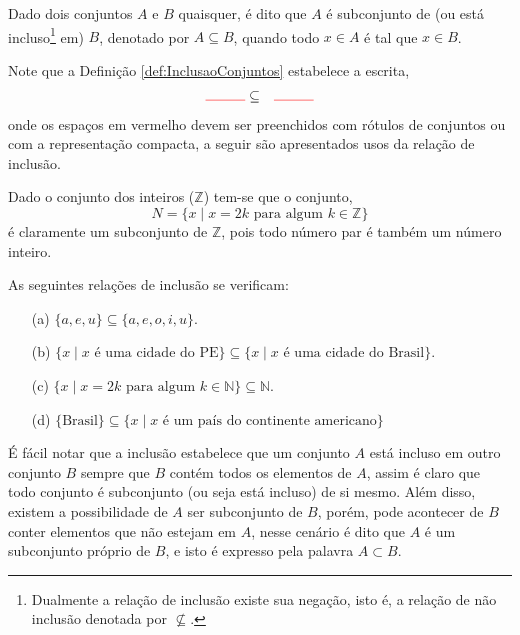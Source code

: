 \begin{definicao}\label{def:InclusaoConjuntos}
  \cite{lipschutz1978-TC} Dado dois conjuntos $A$ e $B$ quaisquer, é dito que $A$ é subconjunto de (ou está incluso\footnote{Dualmente a relação de inclusão existe sua negação, isto é, a relação de não inclusão denotada por $\not\subseteq$.} em) $B$, denotado por $A \subseteq B$, quando todo $x \in A$ é tal que $x \in B$.
\end{definicao}

Note que a Definição \ref{def:InclusaoConjuntos} estabelece a escrita,
\begin{eqnarray*}
  {\color{red}\rule{1cm}{0.4pt}} & \subseteq & {\color{red}\rule{1cm}{0.4pt}} 
\end{eqnarray*}
onde os espaços em {\color{red}vermelho} devem ser preenchidos com rótulos de conjuntos ou com a representação compacta, a seguir são apresentados usos da relação de inclusão.

\begin{exemplo}\label{exe:InclusaoConjuntos1}
  Dado o conjunto dos inteiros ($\mathbb{Z}$) tem-se que o conjunto,  
  $$N = \{x \mid x = 2k \mbox{ para algum } k \in \mathbb{Z}\}$$ 
  é claramente um subconjunto de $\mathbb{Z}$, pois todo número par é também um número inteiro.
\end{exemplo}

\begin{exemplo}\label{exe:InclusaoConjuntos2}
  As seguintes relações de inclusão se verificam:
	\begin{itemize}
		\item[(a)] $\{a, e, u\} \subseteq \{a, e, o, i , u\}$.
		\item[(b)] $\{x \mid x \mbox{ é uma cidade do PE}\} \subseteq \{x \mid x \mbox{ é uma cidade do Brasil}\}$.
		\item[(c)] $\{x \mid x = 2k \mbox{ para algum } k \in \mathbb{N}\} \subseteq \mathbb{N}$.
		\item[(d)] $\{\mbox{Brasil}\} \subseteq \{x \mid x \mbox{ é um país do continente americano}\}$
	\end{itemize}
\end{exemplo}

É fácil notar que a inclusão estabelece que um conjunto $A$ está incluso em outro conjunto $B$ sempre que $B$ contém todos os elementos de $A$, assim é claro que todo conjunto é subconjunto (ou seja está incluso) de si mesmo. Além disso, existem a possibilidade de $A$ ser subconjunto de $B$, porém, pode acontecer de $B$ conter elementos que não estejam em $A$, nesse cenário é dito que $A$ é um subconjunto próprio de $B$, e isto é expresso pela palavra $A \subset B$. 

